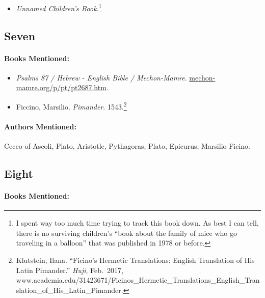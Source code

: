 \documentclass[12pt]{article}
\providecommand{\tightlist}{%
  \setlength{\itemsep}{0pt}\setlength{\parskip}{0pt}}
\begin{document}
\begin{itemize}
\tightlist
\item
  \emph{Unnamed Children's Book}.\footnote{I spent way too much time trying to track this book down. As best I can tell, there is no surviving children's ``book about the family of mice who go traveling in a balloon'' that was published in 1978 or before.}
\end{itemize}

\subsection{Seven}\label{seven-2}

\paragraph{Books Mentioned:}\label{books-mentioned-21}

\begin{itemize}
\tightlist
\item
  \emph{Psalms 87 / Hebrew - English Bible / Mechon-Mamre}. \url{mechon-mamre.org/p/pt/pt2687.htm}.
\item
  Ficcino, Marsilio. \emph{Pimander}. 1543.\footnote{Klutstein, Ilana. ``Ficino's Hermetic Translations: English Translation of His Latin Pimander.'' \emph{Huji}, Feb.~2017, www.academia.edu/31423671/Ficinos\_Hermetic\_Translations\_English\_Translation\_of\_His\_Latin\_Pimander.}
\end{itemize}

\paragraph{Authors Mentioned:}\label{authors-mentioned-15}

Cecco of Ascoli, Plato, Aristotle, Pythagoras, Plato, Epicurus, Marsilio Ficino.

\subsection{Eight}\label{eight-1}

\paragraph{Books Mentioned:}\label{books-mentioned-22}
\end{document}
